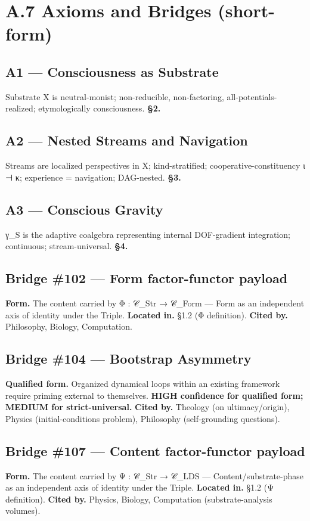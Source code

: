\documentclass[11pt, openany]{book}
\newcommand{\sectionbreak}{\clearpage}
\begin{document}
\sectionbreak

\section{A.7 Axioms and Bridges (short-form)}

\subsection{A1 --- Consciousness as Substrate}
Substrate X is neutral-monist; non-reducible, non-factoring, all-potentials-realized; etymologically consciousness.
\textbf{§2.}

\subsection{A2 --- Nested Streams and Navigation}
Streams are localized perspectives in X; kind-stratified; cooperative-constituency ι ⊣ κ; experience = navigation; DAG-nested.
\textbf{§3.}

\subsection{A3 --- Conscious Gravity}
γ\_\allowbreak{}S is the adaptive coalgebra representing internal DOF-gradient integration; continuous; stream-universal.
\textbf{§4.}

\subsection{Bridge \#102 --- Form factor-functor payload}
\textbf{Form.} The content carried by Φ : 𝒞\_\allowbreak{}Str → 𝒞\_\allowbreak{}Form --- Form as an independent axis of identity under the Triple.
\textbf{Located in.} §1.2 (Φ definition).
\textbf{Cited by.} Philosophy, Biology, Computation.

\subsection{Bridge \#104 --- Bootstrap Asymmetry}
\textbf{Qualified form.} Organized dynamical loops within an existing framework require priming external to themselves.
\textbf{HIGH confidence for qualified form; MEDIUM for strict-universal.}
\textbf{Cited by.} Theology (on ultimacy/origin), Physics (initial-conditions problem), Philosophy (self-grounding questions).

\subsection{Bridge \#107 --- Content factor-functor payload}
\textbf{Form.} The content carried by Ψ : 𝒞\_\allowbreak{}Str → 𝒞\_\allowbreak{}LDS --- Content/substrate-phase as an independent axis of identity under the Triple.
\textbf{Located in.} §1.2 (Ψ definition).
\textbf{Cited by.} Physics, Biology, Computation (substrate-analysis volumes).
\end{document}
